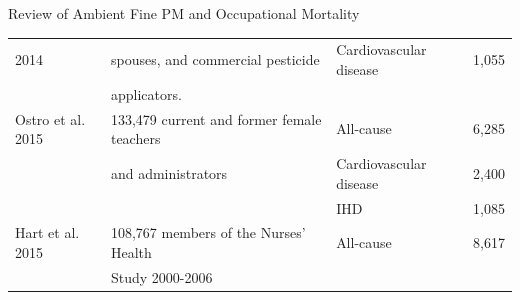\documentclass[final,t]{beamer}
\begin{document}
\begin{frame}[fragile]
\begin{columns}[t]
\begin{column}{0.26\linewidth}
\begin{block}{Review of Ambient Fine PM and Occupational Mortality}
\begin{tabular}{llll}
  2014 & spouses, and commercial pesticide & Cardiovascular disease & 1,055 \\ 
   & applicators. &  &  \\ 
  Ostro et al. 2015 & 133,479 current and former female teachers & All-cause & 6,285 \\ 
   & and administrators & Cardiovascular disease & 2,400 \\ 
   &  & IHD & 1,085 \\ 
  Hart et al. 2015 & 108,767 members of the Nurses' Health  & All-cause & 8,617 \\ 
   & Study 2000-2006 &  &  \\ 
   \hline
\end{tabular}\end{block}
    \end{column}%


\end{columns}
\end{frame}
\end{document}
